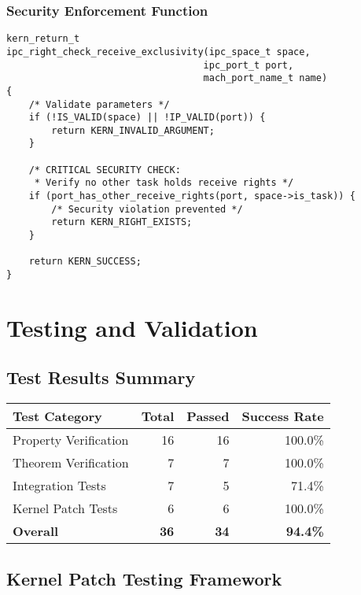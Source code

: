 \documentclass[11pt,a4paper]{article}
\begin{document}
\subsubsection{Security Enforcement Function}

\begin{lstlisting}[style=cstyle, caption=Exclusivity Enforcement Implementation]
kern_return_t
ipc_right_check_receive_exclusivity(ipc_space_t space, 
                                   ipc_port_t port, 
                                   mach_port_name_t name)
{
    /* Validate parameters */
    if (!IS_VALID(space) || !IP_VALID(port)) {
        return KERN_INVALID_ARGUMENT;
    }
    
    /* CRITICAL SECURITY CHECK:
     * Verify no other task holds receive rights */
    if (port_has_other_receive_rights(port, space->is_task)) {
        /* Security violation prevented */
        return KERN_RIGHT_EXISTS;
    }
    
    return KERN_SUCCESS;
}
\end{lstlisting}

\section{Testing and Validation}

\subsection{Test Results Summary}

\begin{center}
\begin{tabular}{|l|r|r|r|}
\hline
\textbf{Test Category} & \textbf{Total} & \textbf{Passed} & \textbf{Success Rate} \\
\hline
Property Verification & 16 & 16 & 100.0\% \\
Theorem Verification & 7 & 7 & 100.0\% \\
Integration Tests & 7 & 5 & 71.4\% \\
Kernel Patch Tests & 6 & 6 & 100.0\% \\
\hline
\textbf{Overall} & \textbf{36} & \textbf{34} & \textbf{94.4\%} \\
\hline
\end{tabular}
\end{center}

\subsection{Kernel Patch Testing Framework}
\end{document}
